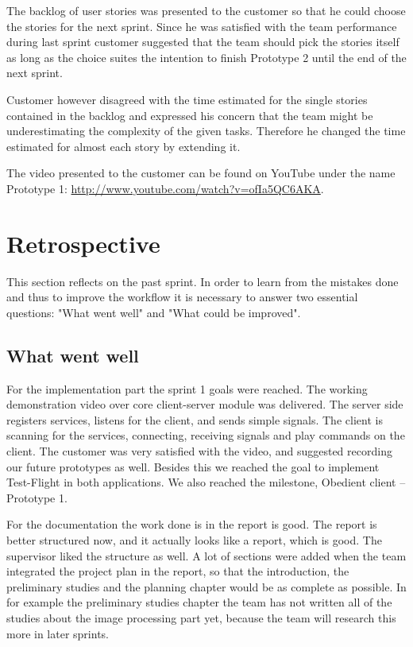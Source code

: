 The backlog of user stories was presented to the customer so that he could choose the stories for the next sprint. Since he was satisfied with the team performance during last sprint customer suggested that the team should pick the stories itself as long as the choice suites the intention to finish Prototype 2 until the end of the next sprint.

Customer however disagreed with the time estimated for the single stories contained in the backlog and expressed his concern that the team might be underestimating the complexity of the given tasks. Therefore he changed the time estimated for almost each story by extending it.

The video presented to the customer can be found on YouTube under the name Prototype 1: \url{http://www.youtube.com/watch?v=ofIa5QC6AKA}.

\section{Retrospective}
This section reflects on the past sprint. In order to learn from the mistakes done and thus to improve the workflow it is necessary to answer two essential questions: "What went well" and "What could be improved".

\subsection{What went well}
For the implementation part the sprint 1 goals were reached. The working demonstration video over core client-server module was delivered. The server side registers services, listens for the client, and sends simple  signals. The client is scanning for the services, connecting, receiving signals and play commands on the client. The customer was very satisfied with the video, and suggested recording our future prototypes as well. Besides this we reached the goal to implement Test-Flight in both applications. We also reached the milestone, Obedient client -- Prototype 1.

For the documentation the work done is in the report is good. The report is better structured now, and it actually looks like a report, which is good. The supervisor liked the structure as well. A lot of sections were added when the team integrated the project plan in the report, so that the introduction, the preliminary studies and the planning chapter would be as complete as possible. In for example the preliminary studies chapter the team has not written all of the studies about the image processing part yet, because the team will research this more in later sprints.

